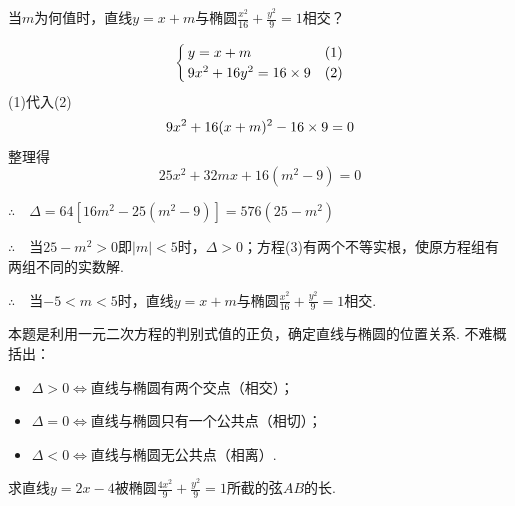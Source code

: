 \begin{example}
    当$m$为何值时，直线$y=x+m$与椭圆$\frac{x^2}{16}+\frac{y^2}{9}=1$相交？
\end{example}

\begin{solution}
\[\begin{cases}
    y=x+m &(1)\\
    9x^2+16y^2=16\times 9&(2)
\end{cases}\]
(1)代入(2)
\[9 x^2+16(x+m)^2-16\times9=0\]
整理得
\begin{equation}
    25x^2+32mx+16(m^2-9)=0 \tag{3}
\end{equation}

$\therefore\quad \Delta =64[16m^2-25(m^2-9)]=576(25-m^2)$

$\therefore\quad $当$25-m^2>0$即$|m|<5$时，$\Delta>0$；方程(3)有两个不等实根，使原方程组有两组不同的实数解.

$\therefore\quad $当$-5<m<5$时，直线$y=x+m$与椭圆$\frac{x^2}{16}+\frac{y^2}{9}=1$相交.
\end{solution}

\begin{remark}
    本题是利用一元二次方程的判别式值的正负，确定直线与椭圆的位置关系. 不难概括出：
\begin{itemize}
    \item $\Delta >0 \Longleftrightarrow$直线与椭圆有两个交点（相交）；
    \item $\Delta =0 \Longleftrightarrow$直线与椭圆只有一个公共点（相切）；
    \item $\Delta <0 \Longleftrightarrow$直线与椭圆无公共点（相离）.
\end{itemize}
\end{remark}

\begin{example}
求直线$y=2x-4$被椭圆$\frac{4x^2}{9}+\frac{y^2}{9}=1$所截的弦$AB$的长.
\end{example}

